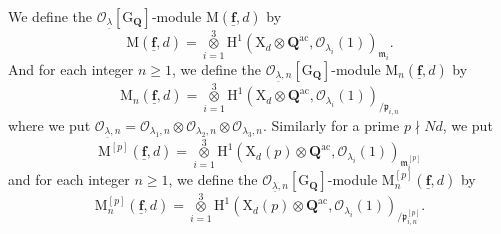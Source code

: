 \documentclass[10pt]{amsart}
\numberwithin{equation}{section}
\theoremstyle{plain}
\numberwithin{equation}{section}
\theoremstyle{definition}
\theoremstyle{remark}
\def\ac{\mathrm{ac}}
\def\frakm{\mathfrak{m}}
\def\ac{\mathrm{ac}}
\def\undlamb{\underline{\lambda}}
\def\triplef{\underline{\mathbf{f}}}
\def\threetensor{\overset{3}{\underset{i=1}\otimes}}
\def\calO{\mathcal{O}}
\def\frakm{\mathfrak{m}}
\def\frakp{\mathfrak{p}}
\def\QQ{\mathbf{Q}}
\def\rmG{\mathrm{G}}
\def\rmH{\mathrm{H}}
\def\rmM{\mathrm{M}}
\def\rmX{\mathrm{X}}
\begin{document}
We define the $\calO_{\undlamb}[\rmG_{\QQ}]$-module 
$\rmM(\triplef,d)$ by 
\begin{equation*}
\rmM(\triplef, d)=\threetensor\rmH^{1}(\rmX_{d}\otimes \QQ^{\ac}, \calO_{\lambda_{i}}(1))_{\frakm_{i}}. 
\end{equation*}
And for each integer $n\geq 1$, we define the $\calO_{\undlamb, n}[\rmG_{\QQ}]$-module $\rmM_{n}(\triplef,d)$ by
\begin{equation*}
\rmM_{n}(\triplef, d)= \threetensor\rmH^{1}(\rmX_{d}\otimes {\QQ^{\ac}}, \calO_{\lambda_{i}}(1))_{/\frakp_{i, n}} 
\end{equation*}
where we put $\calO_{\undlamb, n}=\calO_{\lambda_{1},n}\otimes \calO_{\lambda_{2}, n}\otimes \calO_{\lambda_{3}, n}$. Similarly for a prime $p\nmid Nd$, we put 
\begin{equation*}
\rmM^{[p]}(\triplef, d)=\threetensor\rmH^{1}(\rmX_{d}(p)\otimes \QQ^{\ac}, \calO_{\lambda_{i}}(1))_{\frakm^{[p]}_{i}}
\end{equation*}
and for each integer $n\geq 1$, we define the $\calO_{\undlamb, n}[\rmG_{\QQ}]$-module $\rmM^{[p]}_{n}(\triplef,d)$ by
\begin{equation*}
\rmM^{[p]}_{n}(\triplef, d)= \threetensor\rmH^{1}(\rmX_{d}(p)\otimes {\QQ^{\ac}}, \calO_{\lambda_{i}}(1))_{/\frakp^{[p]}_{i, n}}.
\end{equation*}
\end{document}
